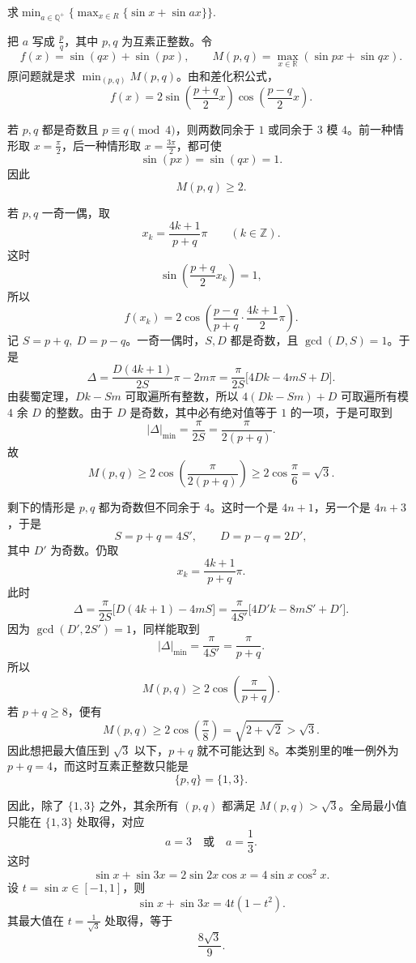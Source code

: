 \begin{example}[正弦和最大值]
    求$\displaystyle\min_{a\in\mathbb{Q}^+}\{\max_{x\in R}\{\sin x+\sin ax\}\}$.
\end{example}
\begin{solution}
把 $a$ 写成 $\frac{p}{q}$，其中 $p,q$ 为互素正整数。令
\[
f(x)= \sin(qx) + \sin(px),\qquad M(p,q) = \max_{x \in \mathbb{R}} (\sin px + \sin qx).
\]
原问题就是求 $\displaystyle\min_{(p,q)} M(p,q)$。由和差化积公式，
\[
f(x) = 2\sin\left(\frac{p+q}{2}x\right)\cos\left(\frac{p-q}{2}x\right).
\]

若 $p,q$ 都是奇数且 $p\equiv q\pmod 4$，则两数同余于 $1$ 或同余于 $3$ 模 $4$。前一种情形取 $x=\frac{\pi}{2}$，后一种情形取 $x=\frac{3\pi}{2}$，都可使
\[
\sin(px)=\sin(qx)=1.
\]
因此
\[
M(p,q)\ge 2.
\]

若 $p,q$ 一奇一偶，取
\[
x_k=\frac{4k+1}{p+q}\pi \qquad (k\in\mathbb Z).
\]
这时
\[
\sin\left(\frac{p+q}{2}x_k\right)=1,
\]
所以
\[
f(x_k) = 2\cos\left(\frac{p-q}{p+q} \cdot \frac{4k+1}{2}\pi\right).
\]
记 $S=p+q,\ D=p-q$。一奇一偶时，$S,D$ 都是奇数，且 \(\gcd(D,S)=1\)。于是
\[
\Delta=\frac{D(4k+1)}{2S}\pi-2m\pi
=\frac{\pi}{2S}\bigl[4Dk-4mS+D\bigr].
\]
由裴蜀定理，$Dk-Sm$ 可取遍所有整数，所以 $4(Dk-Sm)+D$ 可取遍所有模 $4$ 余 $D$ 的整数。由于 $D$ 是奇数，其中必有绝对值等于 $1$ 的一项，于是可取到
\[
|\Delta|_{\min}=\frac{\pi}{2S}=\frac{\pi}{2(p+q)}.
\]
故
\[
M(p,q)\ge 2\cos\left(\frac{\pi}{2(p+q)}\right)\ge 2\cos\frac{\pi}{6}=\sqrt3.
\]

剩下的情形是 $p,q$ 都为奇数但不同余于 $4$。这时一个是 \(4n+1\)，另一个是 \(4n+3\)，于是
\[
S=p+q=4S',\qquad D=p-q=2D',
\]
其中 \(D'\) 为奇数。仍取
\[
x_k=\frac{4k+1}{p+q}\pi.
\]
此时
\[
\Delta=\frac{\pi}{2S}\bigl[D(4k+1)-4mS\bigr]
=\frac{\pi}{4S'}\bigl[4D'k-8mS'+D'\bigr].
\]
因为 \(\gcd(D',2S')=1\)，同样能取到
\[
|\Delta|_{\min}=\frac{\pi}{4S'}=\frac{\pi}{p+q}.
\]
所以
\[
M(p,q)\ge 2\cos\left(\frac{\pi}{p+q}\right).
\]
若 $p+q \ge 8$，便有
\[
M(p,q)\ge 2\cos\left(\frac{\pi}{8}\right)=\sqrt{2+\sqrt{2}}> \sqrt3.
\]
因此想把最大值压到 $\sqrt3$ 以下，$p+q$ 就不可能达到 $8$。本类别里的唯一例外为 $p+q=4$，而这时互素正整数只能是
\[
\{p,q\}=\{1,3\}.
\]

因此，除了 $\{1,3\}$ 之外，其余所有 $(p,q)$ 都满足 $M(p,q)>\sqrt3$。全局最小值只能在 $\{1,3\}$ 处取得，对应
\[
a=3\quad\text{或}\quad a=\frac13.
\]
这时
\[
\sin x+\sin 3x=2\sin 2x\cos x=4\sin x\cos^2x.
\]
设 $t=\sin x\in[-1,1]$，则
\[
\sin x+\sin 3x=4t(1-t^2).
\]
其最大值在 $t=\frac{1}{\sqrt3}$ 处取得，等于
\[
\frac{8\sqrt3}{9}.
\]
\end{solution}

